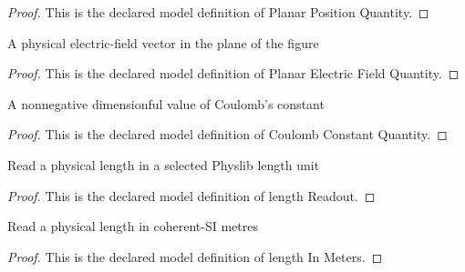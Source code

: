 \begin{proof}
  This is the declared model definition of Planar Position Quantity.
\end{proof}
\begin{definition}
  \label{def:physics:phyx-mini-0915:phyxminiproblems-problemphyxmini0915-planarelectricfieldquantity}
  A physical electric-field vector in the plane of the figure
\end{definition}
\begin{proof}
  This is the declared model definition of Planar Electric Field Quantity.
\end{proof}
\begin{definition}
  \label{def:physics:phyx-mini-0915:phyxminiproblems-problemphyxmini0915-coulombconstantquantity}
  A nonnegative dimensionful value of Coulomb's constant
\end{definition}
\begin{proof}
  This is the declared model definition of Coulomb Constant Quantity.
\end{proof}
\begin{definition}
  \label{def:physics:phyx-mini-0915:phyxminiproblems-problemphyxmini0915-lengthreadout}
  Read a physical length in a selected Physlib length unit
\end{definition}
\begin{proof}
  This is the declared model definition of length Readout.
\end{proof}
\begin{definition}
  \label{def:physics:phyx-mini-0915:phyxminiproblems-problemphyxmini0915-lengthinmeters}
  Read a physical length in coherent-SI metres
\end{definition}
\begin{proof}
  This is the declared model definition of length In Meters.
\end{proof}
